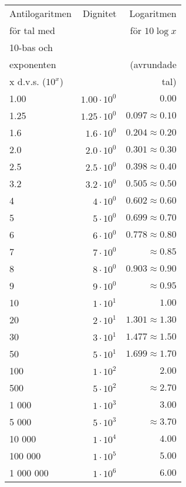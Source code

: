 \begin{tabular}{l|r|r}
Antilogaritmen    & Dignitet & Logaritmen            \\
för tal med       &          & för \(10\log x\)        \\
10-bas och        &          &                       \\
exponenten        &          & (avrundade            \\
x d.v.s. (\(10^x\)) &          & tal)                  \\ \hline
1.00      & \(1.00 \cdot 10^0\) & \(0.00\)               \\
1.25      & \(1.25 \cdot 10^0\) & \(0.097 \approx 0.10\) \\
1.6       & \(1.6 \cdot 10^0\) & \(0.204 \approx 0.20\)  \\
2.0       & \(2.0 \cdot 10^0\) & \(0.301 \approx 0.30\)  \\
2.5       & \(2.5 \cdot 10^0\) & \(0.398 \approx 0.40\)  \\
3.2       & \(3.2 \cdot 10^0\) & \(0.505 \approx 0.50\)  \\
4         & \(4 \cdot 10^0\)   & \(0.602 \approx 0.60\)  \\
5         & \(5 \cdot 10^0\)   & \(0.699 \approx 0.70\)  \\
6         & \(6 \cdot 10^0\)   & \(0.778 \approx 0.80\)  \\
7         & \(7 \cdot 10^0\)   & \(\approx 0.85\)        \\
8         & \(8 \cdot 10^0\)   & \(0.903 \approx 0.90\)  \\
9         & \(9 \cdot 10^0\)   & \(\approx 0.95\)        \\
10        & \(1 \cdot 10^1\)   & \(1.00\)                \\
20        & \(2 \cdot 10^1\)   & \(1.301 \approx 1.30\)  \\
30        & \(3 \cdot 10^1\)   & \(1.477 \approx 1.50\)  \\
50        & \(5 \cdot 10^1\)   & \(1.699 \approx 1.70\)  \\
100       & \(1 \cdot 10^2\)   & \(2.00\)                \\
500       & \(5 \cdot 10^2\)   & \(\approx 2.70\)        \\
1 000     & \(1 \cdot 10^3\)   & \(3.00\)                \\
5 000     & \(5 \cdot 10^3\)   & \(\approx3.70\)         \\
10 000    & \(1 \cdot 10^4\)   & \(4.00\)                \\
100 000   & \(1 \cdot 10^5\)   & \(5.00\)                \\
1 000 000 & \(1 \cdot 10^6\)   & \(6.00\)                \\
\end{tabular}

